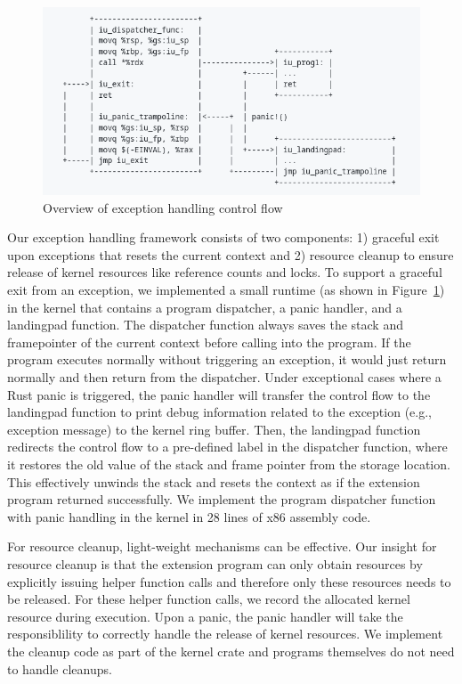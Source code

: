 \begin{figure}
	\includegraphics[width=0.8\linewidth]{figs/EH.png}
	\centering
	\vspace{-10pt}
	\caption{Overview of exception handling control flow}
	\label{fig:eh-overview}
	\vspace{-10pt}
\end{figure}

Our exception handling framework consists of two components: 1) graceful exit
    upon exceptions that resets the current context and 2) resource cleanup to
    ensure release of kernel resources like reference counts and locks.
To support a graceful exit from an exception, we implemented a small runtime
    (as shown in Figure~\ref{fig:eh-overview}) in the kernel that contains a
    program dispatcher, a panic handler, and a landingpad function.
The dispatcher function always saves the stack and framepointer of the current
    context before calling into the program.
If the program executes normally without triggering an exception, it would just
    return normally and then return from the dispatcher.
Under exceptional cases where a Rust panic is triggered, the panic handler will
    transfer the control flow to the landingpad function to print debug
    information related to the exception (e.g., exception message) to the
    kernel ring buffer.
Then, the landingpad function redirects the control flow to a pre-defined label
    in the dispatcher function, where it restores the old value of the stack
    and frame pointer from the storage location.
This effectively unwinds the stack and resets the context as if the extension
    program returned successfully.
We implement the program dispatcher function with panic handling in the kernel
    in 28 lines of x86 assembly code.

For resource cleanup, light-weight mechanisms can be effective.
Our insight for resource cleanup is that the extension program can only obtain
    resources by explicitly issuing helper function calls and therefore only
    these resources needs to be released.
For these helper function calls, we record the allocated kernel resource during
    execution.
Upon a panic, the panic handler will take the responsiblility to correctly
    handle the release of kernel resources.
We implement the cleanup code as part of the \projname{} kernel crate
    and programs themselves do not need to handle cleanups.

